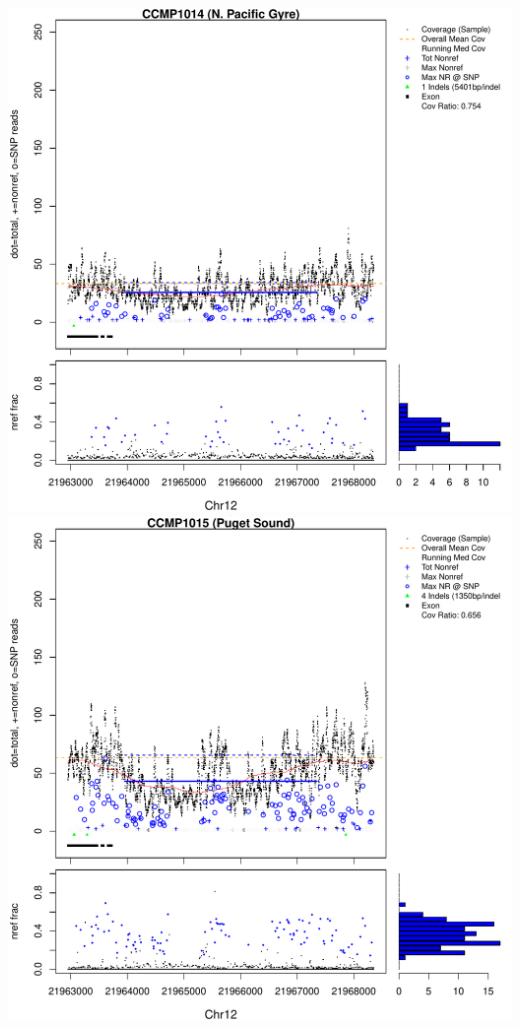 \documentclass{article}\usepackage[]{graphicx}\usepackage[]{color}
\makeatletter
\def\maxwidth{ %
  \ifdim\Gin@nat@width>\linewidth
    \linewidth
  \else
    \Gin@nat@width
  \fi
}
\newenvironment{knitrout}{}{} %
\makeatother
\begin{document}
\begin{knitrout}
{\includegraphics[width=\maxwidth]{figs-knitr/unnamed-chunk-54-5} 
\includegraphics[width=\maxwidth]{figs-knitr/unnamed-chunk-54-6} 
}
\end{knitrout}
\end{document}

